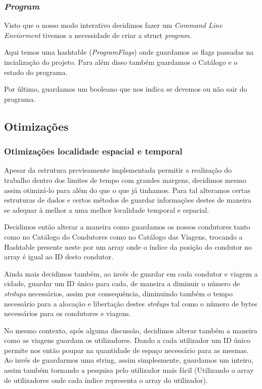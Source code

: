 \documentclass{article}
\begin{document}
        \subsubsection{\emph{Program}}
            Visto que o nosso modo interativo decidimos fazer um \emph{Command Line Enviorment} tivemos
            a necessidade de criar a struct \emph{program}. 

            Aqui temos uma hashtable (\emph{ProgramFlags}) onde guardamos as flags passadas na incialização
            do projeto.
            Para além disso também guardamos o Catálogo e o estado do programa.

            Por último, guardamos um booleano que nos indica se devemos ou não sair do programa.

    \subsection{Otimizações}
        \subsubsection{Otimizações localidade espacial e temporal}
            Apesar da estrutura previeamente implementada permitir a realização
            do trabalho dentro dos limites de tempo com grandes margens, decidimos
            mesmo assim otimizá-lo para além do que o que já tinhamos. Para tal alteramos 
            certas estruturas de dados e certos métodos de guardar informações destes de 
            maneira se adequar à melhor a uma melhor localidade temporal e espacial.
            
            Decidimos então alterar a maneira como guardamos os nossos condutores tanto 
            como no Catálogo do Condutores como no Catálogo das Viagens, trocando a 
            Hashtable presente neste por um array onde o índice da posição do condutor 
            no array é igual ao ID desto condutor. 
            
            Ainda mais decidimos também, ao invés de guardar em cada condutor e viagem a cidade, 
            guardar um ID único para cada, de maneira a diminuir o número de \emph{strdups} necessários,
            assim por consequência, diminuindo também o tempo necessário para a alocação e libertação 
            destes \emph{strdups} tal como o número de bytes necessários para os condutores e
            viagens. 
            
            No mesmo contexto, após alguma discussão, decidimos alterar também
            a maneira como as viagens guardam os utilizadores. Dando a cada utilizador um
            ID único permite nos então poupar na quantidade de espaço necessário para as mesmas.
            Ao invés de guardarmos uma string, assim simplesmente, guardamos um inteiro, assim também
            tornando a pesquisa pelo utilizador mais fácil (Utilizando o array de utilizadores onde cada
            índice representa o array do utilizador).
\end{document}
